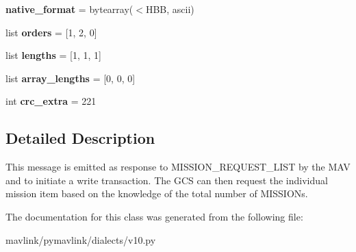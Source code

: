 \begin{DoxyCompactItemize}
{\bfseries native\+\_\+format} = bytearray(\textquotesingle{}$<$H\+BB\textquotesingle{}, \textquotesingle{}ascii\textquotesingle{})
\item 
\mbox{\label{classpymavlink_1_1dialects_1_1v10_1_1MAVLink__mission__count__message_a39d161f6fee5df9b16b3f04af47df9e1}} 
list {\bfseries orders} = \mbox{[}1, 2, 0\mbox{]}
\item 
\mbox{\label{classpymavlink_1_1dialects_1_1v10_1_1MAVLink__mission__count__message_ab7aceb3fdd5e9067faf17671e60cbfdc}} 
list {\bfseries lengths} = \mbox{[}1, 1, 1\mbox{]}
\item 
\mbox{\label{classpymavlink_1_1dialects_1_1v10_1_1MAVLink__mission__count__message_a317193930c0f3da15608b5deea027b66}} 
list {\bfseries array\+\_\+lengths} = \mbox{[}0, 0, 0\mbox{]}
\item 
\mbox{\label{classpymavlink_1_1dialects_1_1v10_1_1MAVLink__mission__count__message_ab529a726cb82b58029ea2c4306291b21}} 
int {\bfseries crc\+\_\+extra} = 221
\end{DoxyCompactItemize}


\subsection{Detailed Description}
\begin{DoxyVerb}This message is emitted as response to MISSION_REQUEST_LIST by
the MAV and to initiate a write transaction. The GCS can then
request the individual mission item based on the knowledge of
the total number of MISSIONs.
\end{DoxyVerb}
 

The documentation for this class was generated from the following file\+:\begin{DoxyCompactItemize}
\item 
mavlink/pymavlink/dialects/v10.\+py\end{DoxyCompactItemize}
